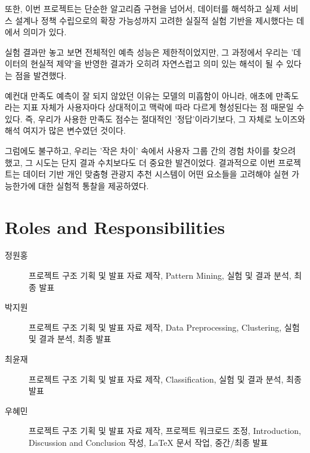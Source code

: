 \documentclass[sigconf]{acmart}
\begin{document}
\begin{CJK}{UTF8}{mj}
또한, 이번 프로젝트는 단순한 알고리즘 구현을 넘어서, 데이터를 해석하고 실제 서비스 설계나 정책 수립으로의 확장 가능성까지 고려한 실질적 실험 기반을 제시했다는 데에서 의미가 있다.

실험 결과만 놓고 보면 전체적인 예측 성능은 제한적이었지만, 그 과정에서 우리는 '데이터의 현실적 제약'을 반영한 결과가 오히려 자연스럽고 의미 있는 해석이 될 수 있다는 점을 발견했다.

예컨대 만족도 예측이 잘 되지 않았던 이유는 모델의 미흡함이 아니라, 애초에 만족도라는 지표 자체가 사용자마다 상대적이고 맥락에 따라 다르게 형성된다는 점 때문일 수 있다. 즉, 우리가 사용한 만족도 점수는 절대적인 '정답'이라기보다, 그 자체로 노이즈와 해석 여지가 많은 변수였던 것이다.

그럼에도 불구하고, 우리는 '작은 차이' 속에서 사용자 그룹 간의 경험 차이를 찾으려 했고, 그 시도는 단지 결과 수치보다도 더 중요한 발견이었다. 결과적으로 이번 프로젝트는 데이터 기반 개인 맞춤형 관광지 추천 시스템이 어떤 요소들을 고려해야 실현 가능한가에 대한 실험적 통찰을 제공하였다.


\section{Roles and Responsibilities}
\begin{description}
  \item[정원홍] 프로젝트 구조 기획 및 발표 자료 제작, Pattern Mining, 실험 및 결과 분석, 최종 발표
  \item[박지원] 프로젝트 구조 기획 및 발표 자료 제작, Data Preprocessing, Clustering, 실험 및 결과 분석, 최종 발표
  \item[최윤재] 프로젝트 구조 기획 및 발표 자료 제작, Classification, 실험 및 결과 분석, 최종 발표
  \item[우혜민] 프로젝트 구조 기획 및 발표 자료 제작, 프로젝트 워크로드 조정, Introduction, Discussion and Conclusion 작성, LaTeX 문서 작업, 중간/최종 발표
\end{description}




\end{CJK}
\end{document}
